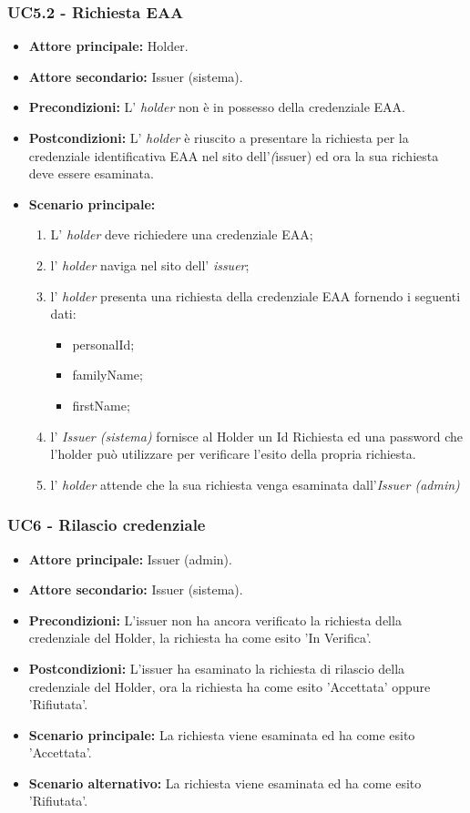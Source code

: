 \subsubsection{UC5.2 - Richiesta EAA}
\begin{itemize}
\item \textbf{Attore principale:} Holder.
\item \textbf{Attore secondario:} Issuer (sistema).
\item \textbf{Precondizioni:} L’ \textit{holder} non è in possesso della credenziale EAA.
\item \textbf{Postcondizioni:} L’ \textit{holder} è riuscito a presentare la richiesta per la credenziale identificativa EAA nel sito dell'\textit(issuer) ed ora la sua richiesta deve essere esaminata.
\item \textbf{Scenario principale:} 
    \begin{enumerate}
        \item L' \textit{holder} deve richiedere una credenziale EAA; 
        \item l' \textit{holder} naviga nel sito dell' \textit{issuer};
        \item l' \textit{holder} presenta una richiesta della credenziale EAA fornendo i seguenti dati:
        \begin{itemize}
            \item personalId;
            \item familyName;
            \item firstName;
        \end{itemize}
        \item l' \textit{Issuer (sistema)} fornisce al Holder un Id Richiesta ed una password che l'holder può utilizzare per verificare l'esito della propria richiesta.
        \item l' \textit{holder} attende che la sua richiesta venga esaminata dall'\textit{Issuer (admin)}
    \end{enumerate}
\end{itemize}

\subsubsection{UC6 - Rilascio credenziale}
\begin{itemize}
    \item \textbf{Attore principale:} Issuer (admin).
    \item \textbf{Attore secondario:} Issuer (sistema).
    \item \textbf{Precondizioni:} L'issuer non ha ancora verificato la richiesta della credenziale del Holder, la richiesta ha come esito 'In Verifica'.
    \item \textbf{Postcondizioni:} L'issuer ha esaminato la richiesta di rilascio della credenziale del Holder, ora la richiesta ha come esito 'Accettata' oppure 'Rifiutata'.
    \item \textbf{Scenario principale:} La richiesta viene esaminata ed ha come esito 'Accettata'.
    \item \textbf{Scenario alternativo:} La richiesta viene esaminata ed ha come esito 'Rifiutata'.
\end{itemize}

